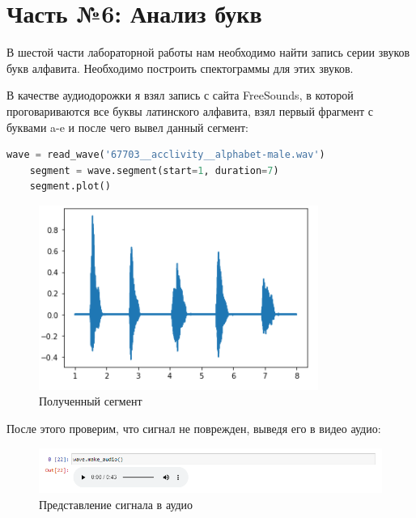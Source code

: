 \documentclass[a4paper]{article}
\begin{document}
    \newpage
        \section{Часть №6: Анализ букв}   
            В шестой части лабораторной работы нам необходимо найти запись серии звуков букв алфавита. Необходимо построить спектограммы для этих звуков.
            
            В качестве аудиодорожки я взял запись с сайта FreeSounds, в которой проговариваются все буквы латинского алфавита, взял первый фрагмент с буквами a-e и после чего вывел данный сегмент:
            
\begin{lstlisting}[language=Python, caption= Вывод сегмента]
    wave = read_wave('67703__acclivity__alphabet-male.wav')
    segment = wave.segment(start=1, duration=7)
    segment.plot()
\end{lstlisting}   
            
             \begin{figure}[H]
                \centering
                \includegraphics{ex_6_wave_segment.png}
                \caption{Полученный сегмент}
                \label{fig:ex_6_wave_segment}
            \end{figure}
            
            После этого проверим, что сигнал не поврежден, выведя его в видео аудио:
            
             \begin{figure}[H]
                \centering
                \includegraphics[width=\textwidth]{ex_6_wave_audio.png}
                \caption{Представление сигнала в аудио}
                \label{fig:ex_6_wave_audio}
            \end{figure}
            
\end{document}
